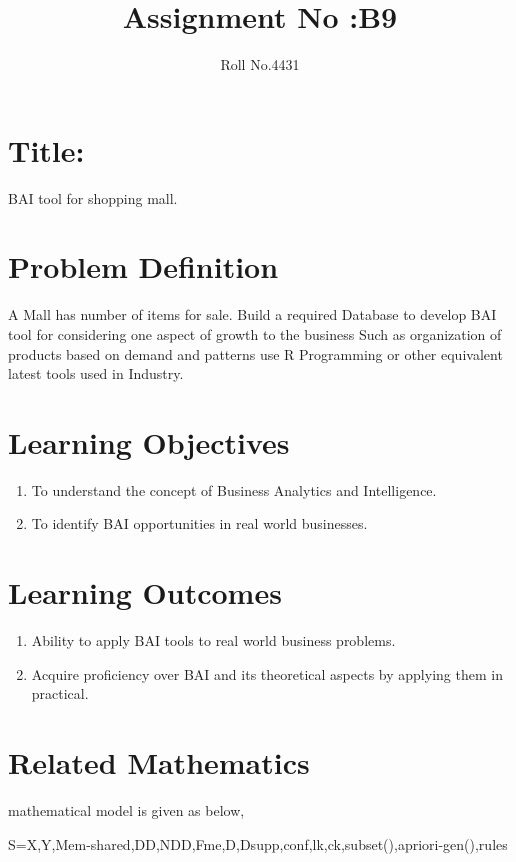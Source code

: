 \documentclass[10pt,a4paper]{article}
\title{Assignment No :B9}
\date{}
\author{Roll No.4431}
\begin{document}
\maketitle
\section{Title:}
BAI tool for shopping mall.

\section{Problem Definition}
A Mall has number of items for sale. Build a required Database to develop BAI tool for considering one aspect of growth to the business Such as organization of products based on demand and patterns use R Programming or other equivalent latest tools used in Industry.


\section{Learning Objectives}
\begin{enumerate}
\item To understand the concept of Business Analytics and Intelligence.
\item To identify BAI opportunities in real world businesses.
\end{enumerate}

\section{Learning Outcomes}
\begin{enumerate}
\item Ability to apply BAI tools to real world business problems.
\item Acquire proficiency over BAI and its theoretical aspects by applying them in practical.
\end{enumerate}


\section{Related Mathematics}

{\rmfamily
	mathematical model is given as below,}


\bigskip

\textrm{S=X,Y,Mem-shared,DD,NDD,Fme,D,Dsupp,conf,lk,ck,subset(),apriori-gen(),rules}


\bigskip
\end{document}
